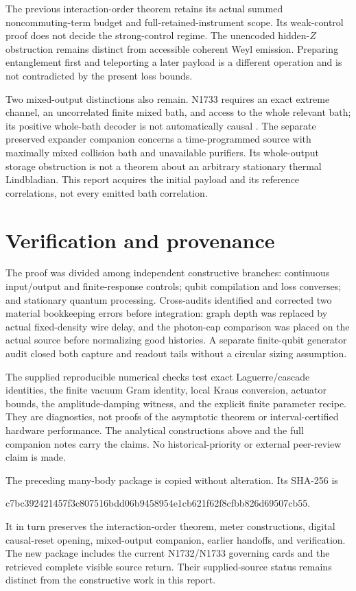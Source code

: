 \documentclass[11pt,a4paper]{article}
\begin{document}
The previous interaction-order theorem retains its actual summed noncommuting-term budget and full-retained-instrument scope. Its weak-control proof does not decide the strong-control regime. The unencoded hidden-$Z$ obstruction remains distinct from accessible coherent Weyl emission. Preparing entanglement first and teleporting a later payload is a different operation and is not contradicted by the present loss bounds.

Two mixed-output distinctions also remain. N1733 requires an exact extreme channel, an uncorrelated finite mixed bath, and access to the whole relevant bath; its positive whole-bath decoder is not automatically causal \cite{astra1733}. The separate preserved expander companion concerns a time-programmed source with maximally mixed collision bath and unavailable purifiers. Its whole-output storage obstruction is not a theorem about an arbitrary stationary thermal Lindbladian. This report acquires the initial payload and its reference correlations, not every emitted bath correlation.

\section{Verification and provenance}

The proof was divided among independent constructive branches: continuous input/output and finite-response controls; qubit compilation and loss converses; and stationary quantum processing. Cross-audits identified and corrected two material bookkeeping errors before integration: graph depth was replaced by actual fixed-density wire delay, and the photon-cap comparison was placed on the actual source before normalizing good histories. A separate finite-qubit generator audit closed both capture and readout tails without a circular sizing assumption.

The supplied reproducible numerical checks test exact Laguerre/cascade identities, the finite vacuum Gram identity, local Kraus conversion, actuator bounds, the amplitude-damping witness, and the explicit finite parameter recipe. They are diagnostics, not proofs of the asymptotic theorem or interval-certified hardware performance. The analytical constructions above and the full companion notes carry the claims. No historical-priority or external peer-review claim is made.

The preceding many-body package is copied without alteration. Its SHA-256 is
\begin{center}\ttfamily\footnotesize
c7bc392421457f3c807516bdd06b9458954e1cb621f62f8cfbb826d69507cb55.
\end{center}
It in turn preserves the interaction-order theorem, meter constructions, digital causal-reset opening, mixed-output companion, earlier handoffs, and verification. The new package includes the current N1732/N1733 governing cards and the retrieved complete visible source return. Their supplied-source status remains distinct from the constructive work in this report.
\end{document}
